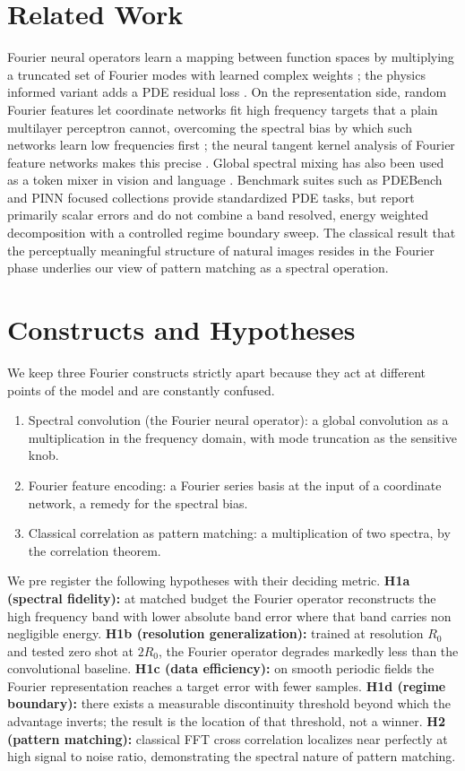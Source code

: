 \documentclass[conference]{IEEEtran}
\begin{document}
\section{Related Work}
Fourier neural operators learn a mapping between function spaces by multiplying a truncated set of Fourier modes with learned complex weights \cite{li2020fno}; the physics informed variant adds a PDE residual loss \cite{li2021pino}. On the representation side, random Fourier features let coordinate networks fit high frequency targets that a plain multilayer perceptron cannot, overcoming the spectral bias by which such networks learn low frequencies first \cite{tancik2020,rahaman2019}; the neural tangent kernel analysis of Fourier feature networks makes this precise \cite{wang2021eigenvector}. Global spectral mixing has also been used as a token mixer in vision and language \cite{rao2021gfnet,leethorp2021fnet}. Benchmark suites such as PDEBench \cite{takamoto2022pdebench} and PINN focused collections provide standardized PDE tasks, but report primarily scalar errors and do not combine a band resolved, energy weighted decomposition with a controlled regime boundary sweep. The classical result that the perceptually meaningful structure of natural images resides in the Fourier phase \cite{oppenheim1981} underlies our view of pattern matching as a spectral operation.

\section{Constructs and Hypotheses}
We keep three Fourier constructs strictly apart because they act at different points of the model and are constantly confused.
\begin{enumerate}
\item Spectral convolution (the Fourier neural operator): a global convolution as a multiplication in the frequency domain, with mode truncation as the sensitive knob.
\item Fourier feature encoding: a Fourier series basis at the input of a coordinate network, a remedy for the spectral bias.
\item Classical correlation as pattern matching: a multiplication of two spectra, by the correlation theorem.
\end{enumerate}

We pre register the following hypotheses with their deciding metric.
\textbf{H1a (spectral fidelity):} at matched budget the Fourier operator reconstructs the high frequency band with lower absolute band error where that band carries non negligible energy.
\textbf{H1b (resolution generalization):} trained at resolution $R_0$ and tested zero shot at $2R_0$, the Fourier operator degrades markedly less than the convolutional baseline.
\textbf{H1c (data efficiency):} on smooth periodic fields the Fourier representation reaches a target error with fewer samples.
\textbf{H1d (regime boundary):} there exists a measurable discontinuity threshold beyond which the advantage inverts; the result is the location of that threshold, not a winner.
\textbf{H2 (pattern matching):} classical FFT cross correlation localizes near perfectly at high signal to noise ratio, demonstrating the spectral nature of pattern matching.
\end{document}
